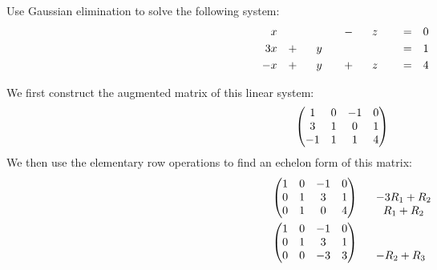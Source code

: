 \documentclass[12pt]{article}
\newenvironment{problem}[2][Problem]
{
	\begin{trivlist} 
		\item[\hskip \labelsep {\bfseries #1 #2:}]
	}
{
	\end{trivlist}
	}
\newenvironment{solution}[1][Solution]
{
	\begin{trivlist} 
		\item[\hskip \labelsep {\itshape #1:}]
	}
	{
	\end{trivlist}
}
\begin{document}
\begin{problem}{1}
Use Gaussian elimination to solve the following system:
\begin{align*}
&&&&&&&&&&&&&&&&&&&&&&&&&&&&&&&& &x&   &\hphantom{500}& &\hphantom{500}& &-&                         &z&                         &=& &0& &&&&&&&&&&&&&&&&&&&&&&&&&&&&&&&&\\
&&&&&&&&&&&&&&&&&&&&&&&&&&&&&&&& 3&x& &+&                        &y&                         &\hphantom{500}& &\hphantom{500}& &=& &1& &&&&&&&&&&&&&&&&&&&&&&&&&&&&&&&& \\
&&&&&&&&&&&&&&&&&&&&&&&&&&&&&&&& -&x&  &+&                        &y&                         &+&                         &z&                        &=& &4&  &&&&&&&&&&&&&&&&&&&&&&&&&&&&&&&&
\end{align*}
\noindent
\newline
\newline
\begin{solution}
We first construct the augmented matrix of this linear system:
\[
\begin{pmatrix} 1&0&-1&0\\3&1&0&1\\-1&1&1&4 \end{pmatrix} \hphantom{500} \begin{matrix}\\ \\\end{matrix}
\]
We then use the elementary row operations to find an echelon form of this matrix:
\begin{align*}
& \begin{pmatrix} 1&0&-1&0\\0&1&3&1\\0&1&0&4 \end{pmatrix} \hphantom{500} \begin{matrix} \hphantom{1} \\-3 R_1 +R_2 \\ R_1 + R_2 \end{matrix} \\
& \begin{pmatrix} 1&0&-1&0\\0&1&3&1\\0&0&-3&3 \end{pmatrix} \hphantom{500} \begin{matrix} \hphantom{1} \\ \hphantom{1} \\ -R_2 + R_3 \end{matrix}\\

\end{align*}
\end{solution}
\end{problem}
\end{document}
